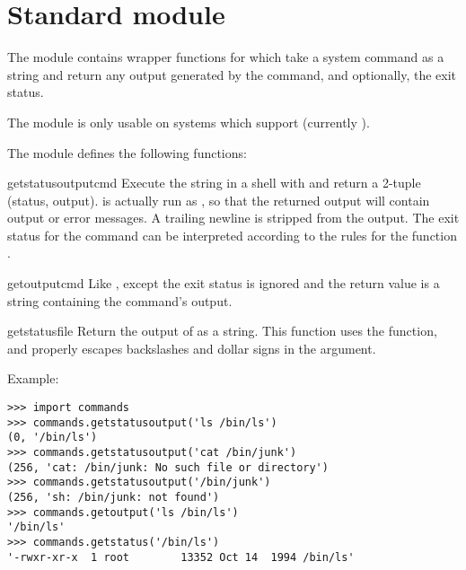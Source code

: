 \section{Standard module }	%
\label{module-commands}

The  module contains wrapper functions for  
which take a system command as a string and return any output generated by 
the command, and optionally, the exit status.

The  module is only usable on systems which support 
 (currently \UNIX{}).

The  module defines the following functions:

\renewcommand{\indexsubitem}{(in module commands)}
\begin{funcdesc}{getstatusoutput}{cmd}
Execute the string  in a shell with  and return
a 2-tuple (status, output).   is actually run as
, so that the returned output will contain output
or error messages. A trailing newline is stripped from the output.
The exit status for the  command can be interpreted according to the
rules for the \C{} function .  
\end{funcdesc}

\begin{funcdesc}{getoutput}{cmd}
Like , except the exit status is ignored and
the return value is a string containing the command's output.  
\end{funcdesc}

\begin{funcdesc}{getstatus}{file}
Return the output of  as a string.  This
function uses the  function, and properly escapes
backslashes and dollar signs in the argument.
\end{funcdesc}

Example:

\begin{verbatim}
>>> import commands
>>> commands.getstatusoutput('ls /bin/ls')
(0, '/bin/ls')
>>> commands.getstatusoutput('cat /bin/junk')
(256, 'cat: /bin/junk: No such file or directory')
>>> commands.getstatusoutput('/bin/junk')
(256, 'sh: /bin/junk: not found')
>>> commands.getoutput('ls /bin/ls')
'/bin/ls'
>>> commands.getstatus('/bin/ls')
'-rwxr-xr-x  1 root        13352 Oct 14  1994 /bin/ls'
\end{verbatim}
